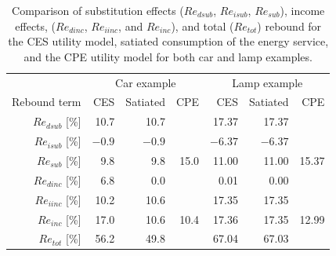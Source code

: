 \documentclass[12pt]{article}\usepackage[]{graphicx}\usepackage[]{xcolor}
\begin{document}
\begin{table}
\footnotesize
\centering
\caption{Comparison of substitution effects
         ($Re_{dsub}$, $Re_{isub}$, $Re_{sub}$),
         income effects,
         ($Re_{dinc}$, $Re_{iinc}$, and $Re_{inc}$), and
         total ($Re_{tot}$) rebound
         for
         the CES utility model,
         satiated consumption of the energy service, and
         the CPE utility model
         for both car and lamp examples.}
\label{tab:utility_model_comparison}
\begin{tabular}{r r r r r r r}
\toprule
                 & \multicolumn{3}{c}{Car example}
                                                & \multicolumn{3}{c}{Lamp example} \\
Rebound term     & CES & Satiated & CPE         & CES & Satiated & CPE             \\
\midrule
$Re_{dsub}$ [\%] & 10.7
                       & 10.7
                                  & 
                                                & 17.37
                                                      & 17.37
                                                                 &  \\
$Re_{isub}$ [\%] & $-0.9$
                       & $-0.9$
                                  & 
                                                & $-6.37$
                                                      & $-6.37$
                                                                 &  \\
\midrule
$Re_{sub}$ [\%]  & 9.8
                       & 9.8
                                  & 15.0
                                                & 11.00
                                                      & 11.00
                                                                 & 15.37 \\
\midrule
$Re_{dinc}$ [\%] & 6.8
                       & 0.0
                                  & 
                                                & 0.01
                                                      & 0.00
                                                                 &  \\
$Re_{iinc}$ [\%] & 10.2
                       & 10.6
                                  & 
                                                & 17.35
                                                      & 17.35
                                                                 &  \\
\midrule
$Re_{inc}$ [\%] & 17.0
                       & 10.6
                                  & 10.4
                                                & 17.36
                                                      & 17.35
                                                                 & 12.99 \\
\midrule
$Re_{tot}$ [\%] & 56.2
                       & 49.8
                                  & 
                                                & 67.04
                                                      & 67.03
                                                                 &  \\
\bottomrule
\end{tabular}
\end{table}
\end{document}
